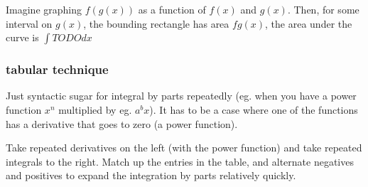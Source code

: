 \documentclass[letterpaper]{article}
\begin{document}
Imagine graphing \(f(g(x))\) as a function of \(f(x)\) and \(g(x)\). Then, for some interval on \(g(x)\), the bounding rectangle has area \(fg(x)\), the area under the curve is \(\int TODO dx\)

\subsubsection{tabular technique}
\label{sec:orgb068db8}
Just syntactic sugar for integral by parts repeatedly (eg. when you have a power function \(x^n\) multiplied by eg. \(a^bx\)). It has to be a case where one of the functions has a derivative that goes to zero (a power function).

Take repeated derivatives on the left (with the power function) and take repeated integrals to the right. Match up the entries in the table, and alternate negatives and positives to expand the integration by parts relatively quickly.
\end{document}
